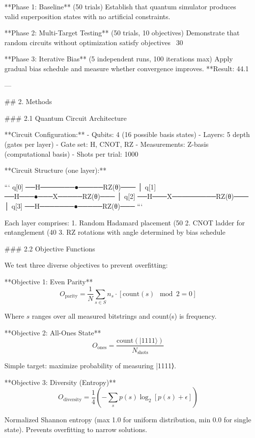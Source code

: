 **Phase 1: Baseline** (50 trials)  
Establish that quantum simulator produces valid superposition states with no artificial constraints.

**Phase 2: Multi-Target Testing** (50 trials, 10 objectives)  
Demonstrate that random circuits without optimization satisfy objectives ~30%

**Phase 3: Iterative Bias** (5 independent runs, 100 iterations max)  
Apply gradual bias schedule and measure whether convergence improves. **Result: 44.1%

---

## 2. Methods

### 2.1 Quantum Circuit Architecture

**Circuit Configuration:**
- Qubits: 4 (16 possible basis states)
- Layers: 5 depth (gates per layer)
- Gate set: {H, CNOT, RZ}
- Measurements: Z-basis (computational basis)
- Shots per trial: 1000

**Circuit Structure (one layer):**

```
q[0] ──H───────●─────RZ(θ)───
                │
q[1] ──H───●───X─────RZ(θ)───
           │
q[2] ──H───X─────────RZ(θ)───
                │
q[3] ──H───────●─────RZ(θ)───
```

Each layer comprises:
1. Random Hadamard placement (50%
2. CNOT ladder for entanglement (40%
3. RZ rotations with angle determined by bias schedule

### 2.2 Objective Functions

We test three diverse objectives to prevent overfitting:

**Objective 1: Even Parity**
\[O_{\text{parity}} = \frac{1}{N} \sum_{s \in S} n_s \cdot [\text{count}(s) \mod 2 = 0]\]

Where \(s\) ranges over all measured bitstrings and count(s) is frequency.

**Objective 2: All-Ones State**
\[O_{\text{ones}} = \frac{\text{count}(\vert 1111\rangle)}{N_{\text{shots}}}\]

Simple target: maximize probability of measuring |1111⟩.

**Objective 3: Diversity (Entropy)**
\[O_{\text{diversity}} = \frac{1}{4} \left( -\sum_{s} p(s) \log_2[p(s) + \epsilon] \right)\]

Normalized Shannon entropy (max 1.0 for uniform distribution, min 0.0 for single state). Prevents overfitting to narrow solutions.

